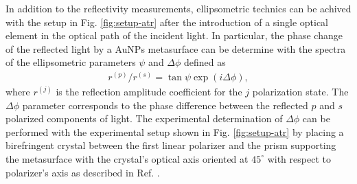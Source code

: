 In addition to the reflectivity measurements, ellipsometric technics can be achived  with the setup in Fig. \ref{fig:setup-atr} after the introduction of a single optical element in the optical path of the incident light. In particular, the phase change of the reflected light by a AuNPs metasurface can be determine with the spectra of the  ellipsometric parameters $\psi$ and $\Delta\phi$ defined as
%
\begin{align}
	{r^{(p)}}/{r^{(s)}} = \tan\psi \exp(i \Delta\phi),
	\label{eq:ellipso}
\end{align}
%
where $r^{(j)}$ is the reflection amplitude coefficient for the $j$ polarization state. The $\Delta\phi$ parameter corresponds to the phase difference between the reflected $p$ and $s$ polarized components of light. The experimental determination of $\Delta\phi$ can be performed with the experimental setup shown in Fig. \ref{fig:setup-atr} by placing a birefringent crystal between the first linear polarizer and the prism supporting the metasurface with the crystal's optical axis oriented at $45^\circ$ with respect to polarizer's axis as described in Ref. \cite{cuanalo_phase_2024}.
